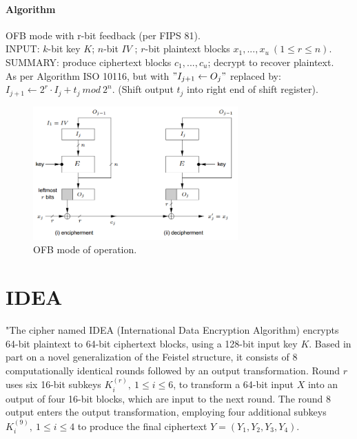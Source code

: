 \documentclass[a4paper,12pt,titlepage]{article}
\begin{document}
\paragraph{Algorithm}
OFB mode with r-bit feedback (per FIPS 81). \citep{menezes_handbook_1996} \\
INPUT: $k$-bit key $K$; $n$-bit $IV$ ; $r$-bit plaintext blocks $x_1, ... , x_u\ (1 \le r \le n)$. \\
SUMMARY: produce ciphertext blocks $c_1, ... , c_u$; decrypt to recover plaintext.\\
As per Algorithm ISO 10116, but with $"I_{j+1} \leftarrow O_j"$ replaced by:\\
$I_{j+1} \leftarrow 2^r \cdot I_j + t_j\ mod\ 2^n.$ (Shift output $t_j$ into right end of shift register).

\begin{figure}[!ht]
	\centering
	\label{fig:ofb}
	\includegraphics[width=0.7\textwidth]{ofb.png}
	\caption{OFB mode of operation. \citep{menezes_handbook_1996}}
\end{figure}

\section{IDEA}

"The cipher named IDEA (International Data Encryption Algorithm) encrypts 64-bit plaintext to 64-bit ciphertext blocks, using a 128-bit input key $K$. Based in part on a novel generalization of the Feistel structure, it consists of 8 computationally identical rounds followed by an output transformation. Round $r$ uses six 16-bit subkeys $K_{i}^{(r)},\ 1 \le i\le 6$, to transform a 64-bit input $X$ into an output of four 16-bit blocks, which are input to the next round. The round 8 output enters the output transformation, employing four additional subkeys $K_{i}^{(9)},\ 1 \le i \le 4$ to produce the final ciphertext $Y = (Y_1, Y_2, Y_3, Y_4)$.
\end{document}
